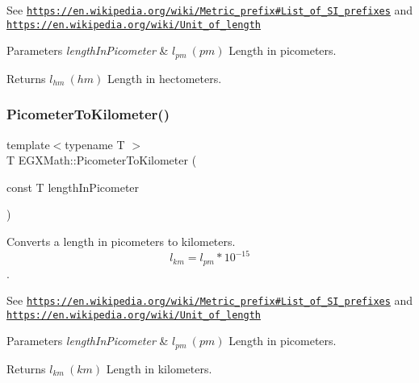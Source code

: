 See \href{https://en.wikipedia.org/wiki/Metric_prefix#List_of_SI_prefixes}{\tt https\+://en.\+wikipedia.\+org/wiki/\+Metric\+\_\+prefix\#\+List\+\_\+of\+\_\+\+S\+I\+\_\+prefixes} and \href{https://en.wikipedia.org/wiki/Unit_of_length}{\tt https\+://en.\+wikipedia.\+org/wiki/\+Unit\+\_\+of\+\_\+length} 
\begin{DoxyParams}{Parameters}
{\em length\+In\+Picometer} & $ l_{pm}\ (pm)$ Length in picometers. \\
\hline
\end{DoxyParams}
\begin{DoxyReturn}{Returns}
$ l_{hm}\ (hm)$ Length in hectometers. 
\end{DoxyReturn}
\mbox{\label{group___e_g_x_math-_conversions-_length_conversions-_picometer-_s_i_ga8a1f5000b027dfc9980738a0565c773e}} 
\subsubsection{\texorpdfstring{Picometer\+To\+Kilometer()}{PicometerToKilometer()}}
{\footnotesize\ttfamily template$<$typename T $>$ \\
T E\+G\+X\+Math\+::\+Picometer\+To\+Kilometer (\begin{DoxyParamCaption}\item[{const T}]{length\+In\+Picometer }\end{DoxyParamCaption})}



Converts a length in picometers to kilometers. \[ l_{km}=l_{pm} * 10^{-15} \]. 

See \href{https://en.wikipedia.org/wiki/Metric_prefix#List_of_SI_prefixes}{\tt https\+://en.\+wikipedia.\+org/wiki/\+Metric\+\_\+prefix\#\+List\+\_\+of\+\_\+\+S\+I\+\_\+prefixes} and \href{https://en.wikipedia.org/wiki/Unit_of_length}{\tt https\+://en.\+wikipedia.\+org/wiki/\+Unit\+\_\+of\+\_\+length} 
\begin{DoxyParams}{Parameters}
{\em length\+In\+Picometer} & $ l_{pm}\ (pm)$ Length in picometers. \\
\hline
\end{DoxyParams}
\begin{DoxyReturn}{Returns}
$ l_{km}\ (km)$ Length in kilometers. 
\end{DoxyReturn}
\mbox{\label{group___e_g_x_math-_conversions-_length_conversions-_picometer-_s_i_gacf6647b0c2ac985376601d5095fa1624}} 
